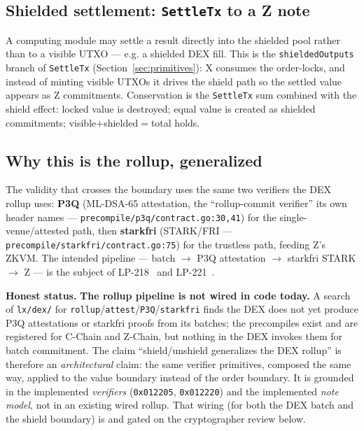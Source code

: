 \subsection{Shielded settlement: \texttt{SettleTx} to a Z note}

A computing module may settle a result directly into the shielded pool
rather than to a visible UTXO --- e.g. a shielded DEX fill. This is the
\texttt{shieldedOutputs} branch of \texttt{SettleTx}
(Section~\ref{sec:primitives}): X consumes the order-locks, and instead
of minting visible UTXOs it drives the shield path so the settled value
appears as Z commitments. Conservation is the \texttt{SettleTx} sum
combined with the shield effect: locked value is destroyed; equal value
is created as shielded commitments; visible$+$shielded$=$total holds.

\subsection{Why this is the rollup, generalized}

The validity that crosses the boundary uses the same two verifiers the
DEX rollup uses: \textbf{P3Q} (ML-DSA-65 attestation, the
``rollup-commit verifier'' its own header names ---
\texttt{precompile/p3q/contract.go:30,41}) for the
single-venue/attested path, then \textbf{starkfri} (STARK/FRI ---
\texttt{precompile/starkfri/contract.go:75}) for the trustless path,
feeding Z's ZKVM. The intended pipeline --- batch $\to$ P3Q attestation
$\to$ starkfri STARK $\to$ Z --- is the subject of LP-218~\cite{lp218}
and LP-221~\cite{lp221}.

\textbf{Honest status.} \DESIGN{} \textbf{The rollup pipeline is not
wired in code today.} A search of \texttt{lx/dex/} for
\texttt{rollup}/\texttt{attest}/\texttt{P3Q}/\texttt{starkfri} finds the
DEX does not yet produce P3Q attestations or starkfri proofs from its
batches; the precompiles exist and are registered for C-Chain and
Z-Chain, but nothing in the DEX invokes them for batch commitment.
The claim ``shield/unshield generalizes the DEX rollup'' is therefore an
\emph{architectural} claim: the same verifier primitives, composed the
same way, applied to the value boundary instead of the order boundary.
It is grounded in the implemented \emph{verifiers}
(\texttt{0x012205}, \texttt{0x012220}) and the implemented \emph{note
model}, not in an existing wired rollup. That wiring (for both the DEX
batch and the shield boundary) is \DESIGN{} and gated on the
cryptographer review below.
